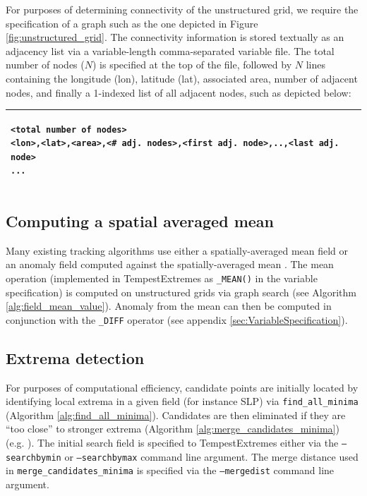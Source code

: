 \documentclass[gmdd, hvmath, online]{copernicus_discussions}
\begin{document}
For purposes of determining connectivity of the unstructured grid, we require the specification of a graph such as the one depicted in Figure \ref{fig:unstructured_grid}.  The connectivity information is stored textually as an adjacency list via a variable-length comma-separated variable file.  The total number of nodes ($N$) is specified at the top of the file, followed by $N$ lines containing the longitude (lon), latitude (lat), associated area, number of adjacent nodes, and finally a 1-indexed list of all adjacent nodes, such as depicted below:
\ \\

\noindent \begin{tabular}{|p{\textwidth}|}
\hline \small \begin{verbatim}
<total number of nodes>
<lon>,<lat>,<area>,<# adj. nodes>,<first adj. node>,..,<last adj. node>
...
\end{verbatim} \\
\hline
\end{tabular}

\subsection{Computing a spatial averaged mean}

Many existing tracking algorithms use either a spatially-averaged mean field or an anomaly field computed against the spatially-averaged mean \citep{haarsma1993tropical,bengtsson1995hurricane}.  The mean operation (implemented in TempestExtremes as \texttt{\_MEAN()} in the variable specification) is computed on unstructured grids via graph search (see Algorithm \ref{alg:field_mean_value}).  Anomaly from the mean can then be computed in conjunction with the \texttt{\_DIFF} operator (see appendix \ref{sec:VariableSpecification}).

\subsection{Extrema detection}

For purposes of computational efficiency, candidate points are initially located by identifying local extrema in a given field (for instance SLP) via \texttt{find\_all\_minima} (Algorithm \ref{alg:find_all_minima}).  Candidates are then eliminated if they are ``too close'' to stronger extrema (Algorithm \ref{alg:merge_candidates_minima}) (e.g. \cite{pinto2005sensitivities}).  The initial search field is specified to TempestExtremes either via the \texttt{--searchbymin} or \texttt{--searchbymax} command line argument.  The merge distance used in \texttt{merge\_candidates\_minima} is specified via the \texttt{--mergedist} command line argument.
\end{document}
